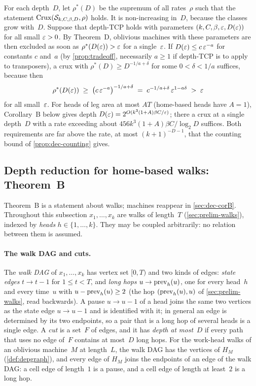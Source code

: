 \begin{remark}\label{rem:dec-rates}
For each depth~$D$, let $\rho^*(D)$ be the supremum of all rates~$\rho$ such that the statement
$\mathrm{Crux}(\mathcal S_{k,C,\beta,D},\rho)$ holds. It is non-increasing in~$D$, because the classes grow with~$D$. Suppose that depth-TCP holds with parameters
$(k,C,\beta,\varepsilon,D(\varepsilon))$ for all small $\varepsilon>0$. By Theorem~D, oblivious machines with these parameters are then
excluded as soon as $\rho^*(D(\varepsilon))>\varepsilon$ for a single~$\varepsilon$. If $D(\varepsilon)\le c\,\varepsilon^{-a}$ for constants $c$
and~$a$ (by \cref{prop:tradeoff}, necessarily $a\ge1$ if depth-TCP is to apply to transposers), a crux with
$\rho^*(D)\ge D^{-1/a+\delta}$ for some $0<\delta<1/a$ suffices, because then
\[
  \rho^*(D(\varepsilon))\;\ge\;\bigl(c\,\varepsilon^{-a}\bigr)^{-1/a+\delta}\;=\;c^{-1/a+\delta}\,\varepsilon^{1-a\delta}\;>\;\varepsilon
\]
for all small~$\varepsilon$. For heads of leg area at most $AT$ (home-based heads have $A=1$), Corollary~B below gives depth
$D(\varepsilon)=2^{O(k^3(1+A)\beta C/\varepsilon)}$; there a crux at a single depth~$D$ with a rate exceeding about
$456k^3(1+A)\beta C/\log_2D$ suffices. Both requirements are far
above the rate, at most $(k+1)^{-D-1}$, that the counting bound of \cref{prop:dec-counting} gives.
\end{remark}

\subsection{Depth reduction for home-based walks: Theorem~B}\label{sec:dec-B}

Theorem~B is a statement about walks; machines reappear in \cref{sec:dec-corB}. Throughout this subsection
$x_1,\dots,x_k$ are walks of length~$T$ (\cref{sec:prelim-walks}), indexed by \emph{heads} $h\in\{1,\dots,k\}$. They
may be coupled arbitrarily: no relation between them is assumed.

\paragraph{The walk DAG and cuts.} The \emph{walk DAG} of $x_1,\dots,x_k$ has vertex set $[0,T)$ and two kinds of
edges: \emph{state edges} $t\to t-1$ for $1\le t<T$, and \emph{long hops} $u\to\mathrm{prev}_h(u)$, one for every head~$h$
and every time~$u$ with $u-\mathrm{prev}_h(u)\ge2$ (the hop $(\mathrm{prev}_h(u),u)$ of \cref{sec:prelim-walks}, read backwards). A
pause $u\to u-1$ of a head joins the same two vertices as the state edge $u\to u-1$ and is identified with it; in
general an edge is determined by its two endpoints, so a pair that is a long hop of several heads is a single edge. A
\emph{cut} is a set~$F$ of edges, and it has \emph{depth at most~$D$} if every path that uses no edge of~$F$ contains
at most~$D$ long hops. For the work-head walks of an oblivious machine~$M$ at length~$L$, the walk DAG has the
vertices of $H_M$ (\cref{def:depgraph}), and every edge of $H_M$ joins the endpoints of an edge of the walk DAG: a
cell edge of length~$1$ is a pause, and a cell edge of length at least~$2$ is a long hop.

